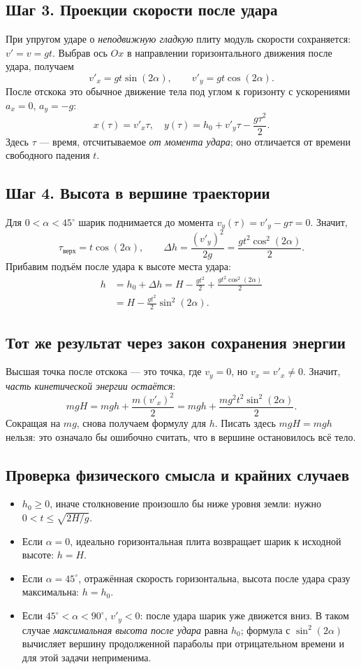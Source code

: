 \documentclass[a4paper,12pt]{article}
\newcommand{\smallhead}[1]{\subsection*{\textcolor{darkaccent}{#1}}}
\begin{document}
\smallhead{Шаг 3. Проекции скорости после удара}
При упругом ударе о \emph{неподвижную гладкую} плиту модуль скорости сохраняется: \(v'=v=gt\). Выбрав ось \(Ox\) в направлении горизонтального движения после удара, получаем
\[
\boxed{v'_x=gt\sin(2\alpha)},\qquad
\boxed{v'_y=gt\cos(2\alpha)}.
\]
После отскока это обычное движение тела под углом к горизонту с ускорениями \(a_x=0\), \(a_y=-g\):
\[
 x(\tau)=v'_x\tau,\quad
 y(\tau)=h_0+v'_y\tau-\frac{g\tau^2}{2}.
\]
Здесь \(\tau\) --- время, отсчитываемое \emph{от момента удара}; оно отличается от времени свободного падения \(t\).

\smallhead{Шаг 4. Высота в вершине траектории}
Для \(0<\alpha<45^\circ\) шарик поднимается до момента \(v_y(\tau)=v'_y-g\tau=0\). Значит,
\[
\tau_{\text{верх}}=t\cos(2\alpha),\qquad
\Delta h=\frac{(v'_y)^2}{2g}=\frac{gt^2\cos^2(2\alpha)}{2}.
\]
Прибавим подъём после удара к высоте места удара:
\[
\begin{aligned}
 h&=h_0+\Delta h
 =H-\frac{gt^2}{2}+\frac{gt^2\cos^2(2\alpha)}{2}\\
 &=\boxed{H-\frac{gt^2}{2}\sin^2(2\alpha)}.
\end{aligned}
\]

\smallhead{Тот же результат через закон сохранения энергии}
Высшая точка после отскока --- это точка, где \(v_y=0\), но \(v_x=v'_x\ne0\). Значит, \emph{часть кинетической энергии остаётся}:
\[
mgH=mgh+\frac{m(v'_x)^2}{2}
=mgh+\frac{m g^2t^2\sin^2(2\alpha)}{2}.
\]
Сокращая на \(mg\), снова получаем формулу для \(h\). Писать здесь \(mgH=mgh\) нельзя: это означало бы ошибочно считать, что в вершине остановилось всё тело.

\smallhead{Проверка физического смысла и крайних случаев}
\begin{itemize}
\item \(h_0\ge0\), иначе столкновение произошло бы ниже уровня земли: нужно \(0<t\le\sqrt{2H/g}\).
\item Если \(\alpha=0\), идеально горизонтальная плита возвращает шарик к исходной высоте: \(h=H\).
\item Если \(\alpha=45^\circ\), отражённая скорость горизонтальна, высота после удара сразу максимальна: \(h=h_0\).
\item Если \(45^\circ<\alpha<90^\circ\), \(v'_y<0\): после удара шарик уже движется вниз. В таком случае \emph{максимальная высота после удара} равна \(h_0\); формула с \(\sin^2(2\alpha)\) вычисляет вершину продолженной параболы при отрицательном времени и для этой задачи неприменима.
\end{itemize}
\end{document}
